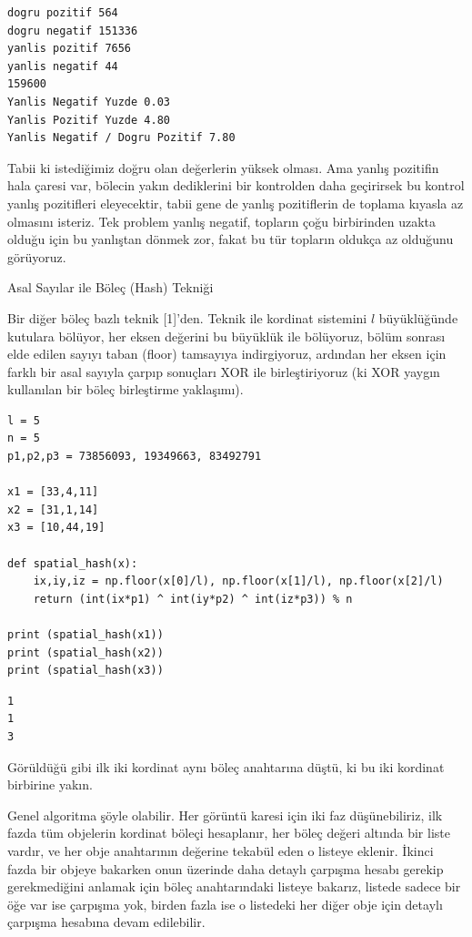 \documentclass[12pt,fleqn]{article}\usepackage{../../common}
\begin{document}
\begin{verbatim}
dogru pozitif 564
dogru negatif 151336
yanlis pozitif 7656
yanlis negatif 44
159600
Yanlis Negatif Yuzde 0.03
Yanlis Pozitif Yuzde 4.80
Yanlis Negatif / Dogru Pozitif 7.80
\end{verbatim}

Tabii ki istediğimiz doğru olan değerlerin yüksek olması. Ama yanlış pozitifin
hala çaresi var, bölecin yakın dediklerini bir kontrolden daha geçirirsek bu
kontrol yanlış pozitifleri eleyecektir, tabii gene de yanlış pozitiflerin de
toplama kıyasla az olmasını isteriz. Tek problem yanlış negatif, topların çoğu
birbirinden uzakta olduğu için bu yanlıştan dönmek zor, fakat bu tür topların
oldukça az olduğunu görüyoruz.

Asal Sayılar ile Böleç (Hash) Tekniği

Bir diğer böleç bazlı teknik [1]'den. Teknik ile kordinat sistemini $l$
büyüklüğünde kutulara bölüyor, her eksen değerini bu büyüklük ile bölüyoruz,
bölüm sonrası elde edilen sayıyı taban (floor) tamsayıya indirgiyoruz, ardından
her eksen için farklı bir asal sayıyla çarpıp sonuçları XOR ile birleştiriyoruz
(ki XOR yaygın kullanılan bir böleç birleştirme yaklaşımı).

\begin{verbatim}
l = 5
n = 5
p1,p2,p3 = 73856093, 19349663, 83492791

x1 = [33,4,11]
x2 = [31,1,14]
x3 = [10,44,19]

def spatial_hash(x):
    ix,iy,iz = np.floor(x[0]/l), np.floor(x[1]/l), np.floor(x[2]/l)
    return (int(ix*p1) ^ int(iy*p2) ^ int(iz*p3)) % n

print (spatial_hash(x1))
print (spatial_hash(x2))
print (spatial_hash(x3))
\end{verbatim}

\begin{verbatim}
1
1
3
\end{verbatim}

Görüldüğü gibi ilk iki kordinat aynı böleç anahtarına düştü, ki bu iki kordinat
birbirine yakın.

Genel algoritma şöyle olabilir. Her görüntü karesi için iki faz düşünebiliriz,
ilk fazda tüm objelerin kordinat böleçi hesaplanır, her böleç değeri altında bir
liste vardır, ve her obje anahtarının değerine tekabül eden o listeye
eklenir. İkinci fazda bir objeye bakarken onun üzerinde daha detaylı çarpışma
hesabı gerekip gerekmediğini anlamak için böleç anahtarındaki listeye bakarız,
listede sadece bir öğe var ise çarpışma yok, birden fazla ise o listedeki her
diğer obje için detaylı çarpışma hesabına devam edilebilir.
\end{document}
